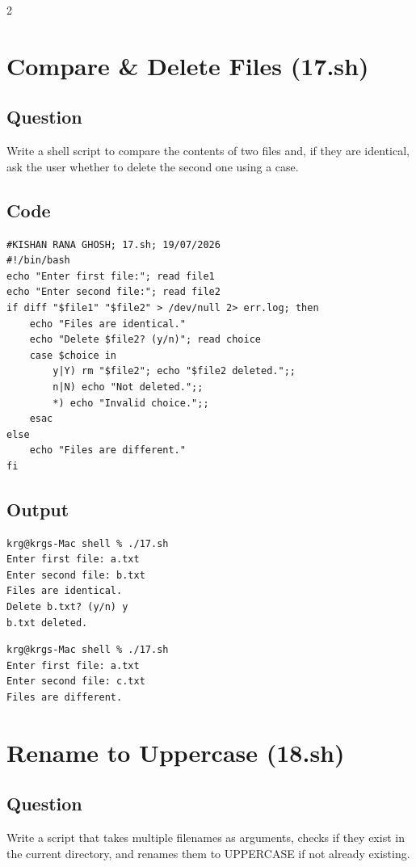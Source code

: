 \documentclass[a4paper,12pt]{article}
\begin{document}
\begin{multicols}{2}

\section{Compare \& Delete Files (17.sh)}
\subsection*{Question}
Write a shell script to compare the contents of two files and, if they are identical, ask the user whether to delete the second one using a case.

\subsection*{Code}
\begin{lstlisting}[style=bashstyle]
#KISHAN RANA GHOSH; 17.sh; 19/07/2026
#!/bin/bash
echo "Enter first file:"; read file1
echo "Enter second file:"; read file2
if diff "$file1" "$file2" > /dev/null 2> err.log; then
    echo "Files are identical."
    echo "Delete $file2? (y/n)"; read choice
    case $choice in
        y|Y) rm "$file2"; echo "$file2 deleted.";;
        n|N) echo "Not deleted.";;
        *) echo "Invalid choice.";;
    esac
else
    echo "Files are different."
fi
\end{lstlisting}

\subsection*{Output}
\begin{lstlisting}[style=outputstyle]
krg@krgs-Mac shell % ./17.sh
Enter first file: a.txt
Enter second file: b.txt
Files are identical.
Delete b.txt? (y/n) y
b.txt deleted.
\end{lstlisting}
\begin{lstlisting}[style=outputstyle]
krg@krgs-Mac shell % ./17.sh
Enter first file: a.txt
Enter second file: c.txt
Files are different.
\end{lstlisting}

\columnbreak

\section{Rename to Uppercase (18.sh)}
\subsection*{Question}
Write a script that takes multiple filenames as arguments, checks if they exist in the current directory, and renames them to UPPERCASE if not already existing.


\end{multicols}
\end{document}
